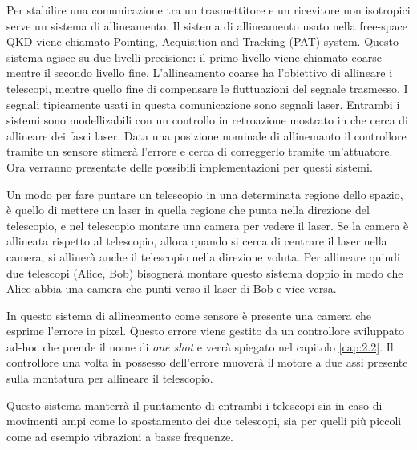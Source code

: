 Per stabilire una comunicazione tra un trasmettitore e un ricevitore non isotropici serve un sistema di allineamento. Il sistema di allineamento usato nella free-space QKD viene chiamato Pointing, Acquisition and Tracking (PAT) system. Questo sistema agisce su due livelli precisione: il primo livello viene chiamato coarse mentre il secondo livello fine. L'allineamento coarse ha l'obiettivo di allineare i telescopi, mentre quello fine di compensare le fluttuazioni del segnale trasmesso. I segnali tipicamente usati in questa comunicazione sono segnali laser. Entrambi i sistemi sono modellizabili con un controllo in retroazione mostrato in  che cerca di allineare dei fasci laser. Data una posizione nominale di allinemanto il controllore tramite un sensore stimerà l'errore e cerca di correggerlo tramite un'attuatore. Ora verranno presentate delle possibili implementazioni per questi sistemi.

Un modo per fare puntare un telescopio in una determinata regione dello spazio, è quello di mettere un laser in quella regione che punta nella direzione del telescopio, e nel telescopio montare una camera per vedere il laser. Se la camera è allineata rispetto al telescopio, allora quando si cerca di centrare il laser nella camera, si allinerà anche il telescopio nella direzione voluta. Per allineare quindi due telescopi (Alice, Bob) bisognerà montare questo sistema doppio in modo che Alice abbia una camera che punti verso il laser di Bob e vice versa.

In questo sistema di allineamento come sensore è presente una camera che esprime l'errore in pixel. Questo errore viene gestito da un controllore sviluppato ad-hoc che prende il nome di \textit{one shot} e verrà spiegato nel capitolo \ref{cap:2.2}. Il controllore una volta in possesso dell'errore muoverà il motore a due assi presente sulla montatura per allineare il telescopio.

Questo sistema manterrà il puntamento di entrambi i telescopi sia in caso di movimenti ampi come lo spostamento dei due telescopi, sia per quelli più piccoli come ad esempio vibrazioni a basse frequenze.


